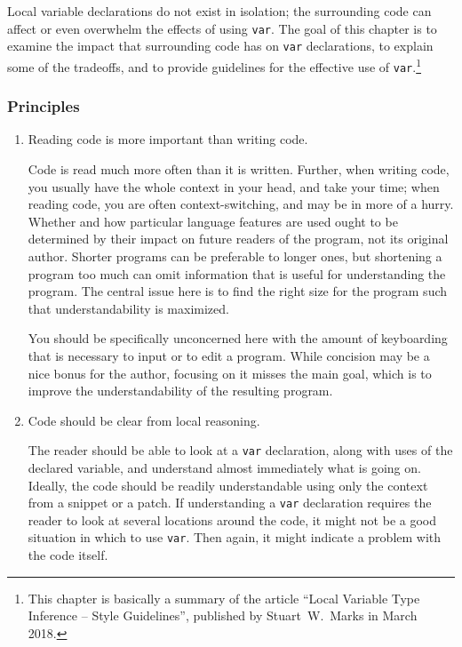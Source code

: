 Local variable declarations do not exist in isolation; the surrounding code can affect or even overwhelm the effects of using \lstinline|var|. The goal of this chapter is to examine the impact that surrounding code has on \lstinline|var| declarations, to explain some of the tradeoffs, and to provide guidelines for the effective use of \lstinline|var|.\footnote{This chapter is basically a summary of the article “Local Variable Type Inference – Style Guidelines”, published by Stuart~W.~Marks in March 2018\autocite{Marks:LocalVariableTypeInference}.}

\subsubsection{Principles}
\begin{enumerate}[label=P\arabic*.]
\item{Reading code is more important than writing code.

Code is read much more often than it is written. Further, when writing code, you usually have the whole context in your head, and take your time; when reading code, you are often context-switching, and may be in more of a hurry. Whether and how particular language features are used ought to be determined by their impact on future readers of the program, not its original author. Shorter programs can be preferable to longer ones, but shortening a program too much can omit information that is useful for understanding the program. The central issue here is to find the right size for the program such that understandability is maximized.

You should be specifically unconcerned here with the amount of keyboarding that is necessary to input or to edit a program. While concision may be a nice bonus for the author, focusing on it misses the main goal, which is to improve the understandability of the resulting program.}

\item{Code should be clear from local reasoning.

The reader should be able to look at a \lstinline|var| declaration, along with uses of the declared variable, and understand almost immediately what is going on. Ideally, the code should be readily understandable using only the context from a snippet or a patch. If understanding a \lstinline|var| declaration requires the reader to look at several locations around the code, it might not be a good situation in which to use \lstinline|var|. Then again, it might indicate a problem with the code itself.}


\end{enumerate}
